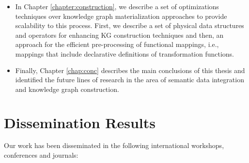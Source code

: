\begin{itemize}
    \item In Chapter \ref{chapter:construction}, we describe a set of optimizations techniques over knowledge graph materialization approaches to provide scalability to this process. First, we describe a set of physical data structures and operators for enhancing KG construction techniques and then, an approach for the efficient pre-processing of functional mappings, i.e., mappings that include declarative definitions of transformation functions.
    \item Finally, Chapter \ref{chap:conc} describes the main conclusions of this thesis and identified the future lines of research in the area of semantic data integration and knowledge graph construction.
\end{itemize}


\section{Dissemination Results}
\label{sec:disresults}

Our work has been disseminated in the following international workshops, conferences and journals:

